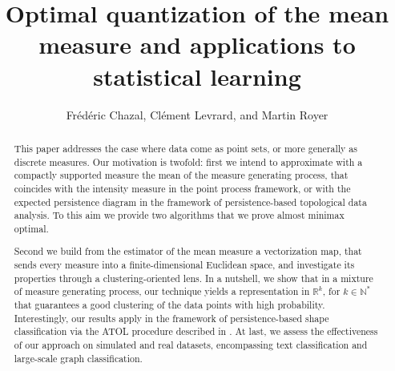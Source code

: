 \documentclass[noinfoline,preprint]{article}
\renewcommand{\1}{\mathds 1}
\begin{document}
\begin{frontmatter}
\title{Optimal quantization of the mean measure and applications to statistical learning}
\author{Fr\'ed\'eric Chazal, Cl\'ement Levrard, and Martin Royer}
\date{}
\maketitle
{}

%
\begin{abstract}
This paper addresses the case where data come as point sets, or more generally as discrete measures. Our motivation is twofold: first we intend to approximate with a compactly supported measure the mean of the measure generating process, that coincides with the intensity measure in the point process framework, or with the expected persistence diagram in the framework of persistence-based topological data analysis. To this aim we provide two algorithms that we prove almost minimax optimal. 

Second we build from the estimator of the mean measure a vectorization map, that sends every measure into a finite-dimensional Euclidean space, and investigate its properties through a clustering-oriented lens. In a nutshell, we show that in a mixture of measure generating process, our technique yields a representation in $\mathbb{R}^k$, for $k \in \mathbb{N}^*$ that guarantees a good clustering of the data points with high probability. Interestingly, our results apply in the framework of persistence-based shape classification via the ATOL procedure described in \cite{Royer19}.  
     At last, we assess the effectiveness of our approach on simulated and real datasets, encompassing text classification and large-scale graph classification.
\end{abstract}
\end{frontmatter}
\end{document}
